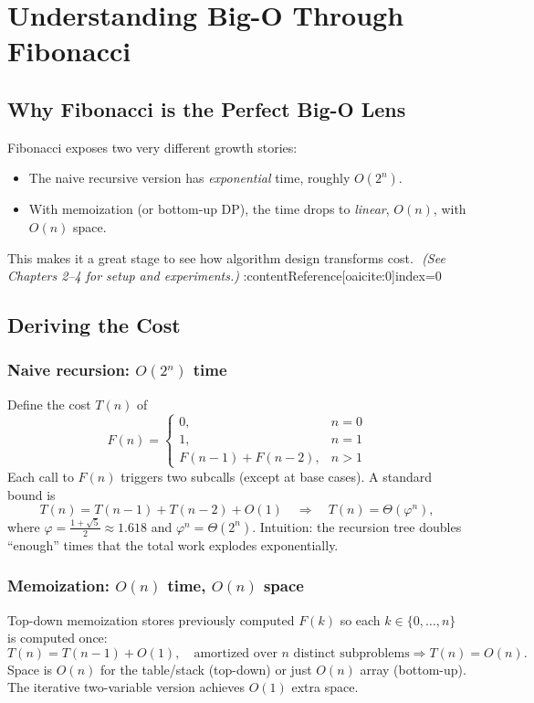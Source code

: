 \chapter{Understanding Big-O Through Fibonacci}
\label{ch:big-o-fib}

\section{Why Fibonacci is the Perfect Big-O Lens}
Fibonacci exposes two very different growth stories:
\begin{itemize}
  \item The naive recursive version has \emph{exponential} time, roughly $O(2^n)$.
  \item With memoization (or bottom-up DP), the time drops to \emph{linear}, $O(n)$, with $O(n)$ space.
\end{itemize}
This makes it a great stage to see how algorithm design transforms cost. \,\,\textit{(See Chapters 2--4 for setup and experiments.)} :contentReference[oaicite:0]{index=0}

\section{Deriving the Cost}
\subsection{Naive recursion: $O(2^n)$ time}
Define the cost $T(n)$ of
\[
F(n)=
\begin{cases}
0,& n=0\\
1,& n=1\\
F(n-1)+F(n-2),& n>1
\end{cases}
\]
Each call to $F(n)$ triggers two subcalls (except at base cases). A standard bound is
\[
T(n)=T(n-1)+T(n-2)+O(1) \quad \Rightarrow \quad T(n)=\Theta(\varphi^n),
\]
where $\varphi=\frac{1+\sqrt{5}}{2}\approx1.618$ and $\varphi^n=\Theta(2^n)$.
Intuition: the recursion tree doubles “enough” times that the total work explodes exponentially.

\subsection{Memoization: $O(n)$ time, $O(n)$ space}
Top-down memoization stores previously computed $F(k)$ so each $k\in\{0,\dots,n\}$ is computed once:
\[
T(n)=T(n-1)+O(1), \quad \text{amortized over } n \text{ distinct subproblems} \Rightarrow T(n)=O(n).
\]
Space is $O(n)$ for the table/stack (top-down) or just $O(n)$ array (bottom-up). The iterative two-variable version achieves $O(1)$ extra space.




